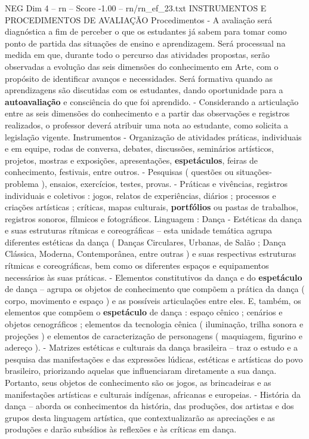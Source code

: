 \begin{textsample}{NEG Dim 4 – rn – Score -1.00 – rn/rn\_ef\_23.txt}  \label{ex:f4_neg_205}
INSTRUMENTOS E PROCEDIMENTOS DE AVALIAÇÃO Procedimentos - A avaliação será diagnóstica a fim de perceber o que os estudantes já sabem para tomar como ponto de partida das situações de ensino e aprendizagem.
Será processual na medida em que, durante todo o percurso das atividades propostas, serão observadas a evolução das seis dimensões do conhecimento em Arte, com o propósito de identificar avanços e necessidades.
Será formativa quando as aprendizagens são discutidas com os estudantes, dando oportunidade para a \textbf{autoavaliação} e consciência do que foi aprendido. - Considerando a articulação entre as seis dimensões do conhecimento e a partir das observações e registros realizados, o professor deverá atribuir uma nota ao estudante, como solicita a legislação vigente.
Instrumentos - Organização de atividades práticas, individuais e em equipe, rodas de conversa, debates, discussões, seminários artísticos, projetos, mostras e exposições, apresentações, \textbf{espetáculos}, feiras de conhecimento, festivais, entre outros. - Pesquisas ( questões ou situações-problema ), ensaios, exercícios, testes, provas. - Práticas e vivências, registros individuais e coletivos : jogos, relatos de experiências, diários ; processos e criações artísticas ; críticas, mapas culturais, \textbf{portfólios} ou pastas de trabalhos, registros sonoros, fílmicos e fotográficos.
Linguagem : Dança - Estéticas da dança e suas estruturas rítmicas e coreográficas – esta unidade temática agrupa diferentes estéticas da dança ( Danças Circulares, Urbanas, de Salão ; Dança Clássica, Moderna, Contemporânea, entre outras ) e suas respectivas estruturas rítmicas e coreográficas, bem como os diferentes espaços e equipamentos necessários às suas práticas. - Elementos constitutivos da dança e do \textbf{espetáculo} de dança – agrupa os objetos de conhecimento que compõem a prática da dança ( corpo, movimento e espaço ) e as possíveis articulações entre eles.
E, também, os elementos que compõem o \textbf{espetáculo} de dança : espaço cênico ; cenários e objetos cenográficos ; elementos da tecnologia cênica ( iluminação, trilha sonora e projeções ) e elementos de caracterização de personagens ( maquiagem, figurino e adereço ). - Matrizes estéticas e culturais da dança brasileira – traz o estudo e a pesquisa das manifestações e das expressões lúdicas, estéticas e artísticas do povo brasileiro, priorizando aquelas que influenciaram diretamente a sua dança.
Portanto, seus objetos de conhecimento são os jogos, as brincadeiras e as manifestações artísticas e culturais indígenas, africanas e europeias. - História da dança – aborda os conhecimentos da história, das produções, dos artistas e dos grupos desta linguagem artística, que contextualizarão as apreciações e as produções e darão subsídios às reflexões e às críticas em dança.

\end{textsample}

